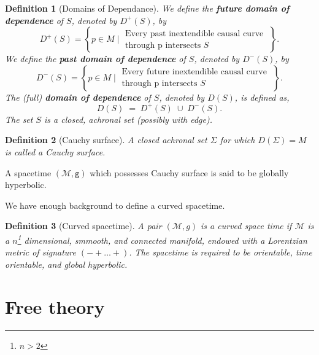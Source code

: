 \documentclass[10pt]{book}
\newcommand{\Mcal}{\mathcal{M}}
\newcommand{\gsf}{\mathsf{g}}
\theoremstyle{break}
\newtheorem{definition}{Definition}
\begin{document}
\begin{definition}[Domains of Dependance]
We define the \textbf{future domain of dependence} of $S$, denoted by $D^{+}(S)$, by
\begin{equation*}
 D^{+}(S) = \left\{ p \in M \; \bigg| \; \begin{array}{l} \text{Every past inextendible causal curve} \\ \text{through p intersects $S$} \end{array} \; \right\}.
\end{equation*}
We define the \textbf{past domain of dependence} of $S$, denoted by $D^{-}(S)$, by
\begin{equation*}
 D^{-}(S) = \left\{ p \in M \; \bigg| \; \begin{array}{l} \text{Every future inextendible causal curve} \\ \text{through p intersects $S$} \end{array} \; \right\}.
\end{equation*}
The (full) \textbf{domain of dependence} of $S$, denoted by $D(S)$, is defined as,
\begin{equation*}
D(S) \; = \; D^{+}(S) \; \cup \; D^{-}(S).
\end{equation*}
The set $S$ is a closed, achronal set (possibly with edge). 
\end{definition}

\begin{definition}[Cauchy surface]
A closed achronal set $\Sigma$ for which $D(\Sigma) = M$ is called a Cauchy surface. 
\end{definition}

A spacetime $(\Mcal,\gsf)$ which possesses Cauchy surface is said to be globally hyperbolic. \par


We have enough background to define a curved spacetime.

\begin{definition}[Curved spacetime]
A pair $(\Mcal,g)$ is a curved space time if $\Mcal$ is a $n$\footnote{$n>2$} dimensional, smmooth, and connected manifold, endowed with a Lorentzian metric of signature $( - + \dots +)$. The spacetime is required to be orientable, time orientable, and global hyperbolic. 
\end{definition}


\chapter{Free theory}
\end{document}
